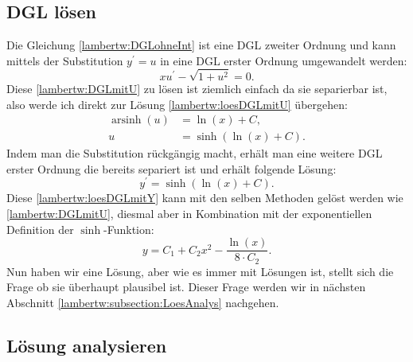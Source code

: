 \subsection{DGL lösen
	\label{lambertw:subsection:DGLloes}}
Die Gleichung \eqref{lambertw:DGLohneInt} ist eine DGL zweiter Ordnung und kann 
mittels der Substitution \(y^{\prime} = u\) in eine DGL erster Ordnung umgewandelt werden:
\begin{equation}
	xu^{\prime} - \sqrt{1+u^2}
	= 0.
	\label{lambertw:DGLmitU}
\end{equation}
Diese \eqref{lambertw:DGLmitU} zu lösen ist ziemlich einfach da sie separierbar ist, also werde ich direkt zur Lösung \eqref{lambertw:loesDGLmitU} übergehen:
\begin{align}
	\operatorname{arsinh}(u)
	&=
	\operatorname{ln}(x) + C, \\
	u
	&=
	\operatorname{sinh}(\operatorname{ln}(x) + C).
	\label{lambertw:loesDGLmitU}
\end{align}
Indem man die Substitution rückgängig macht, erhält man eine weitere DGL erster Ordnung die bereits separiert ist und erhält folgende Lösung:
\begin{equation}
	y^{\prime}
	=
	\operatorname{sinh}(\operatorname{ln}(x) + C).
	\label{lambertw:loesDGLmitY}
\end{equation}
Diese \eqref{lambertw:loesDGLmitY} kann mit den selben Methoden gelöst werden wie \eqref{lambertw:DGLmitU}, diesmal aber in Kombination mit der exponentiellen Definition der \(\operatorname{sinh}\)-Funktion:
\begin{equation}
	y
	=
	C_1 + C_2 x^2 - \frac{\operatorname{ln}(x)}{8 \cdot C_2}.
\end{equation}
Nun haben wir eine Lösung, aber wie es immer mit Lösungen ist, stellt sich die Frage ob sie überhaupt plausibel ist. Dieser Frage werden wir in nächsten Abschnitt \ref{lambertw:subsection:LoesAnalys} nachgehen.

\subsection{Lösung analysieren
	\label{lambertw:subsection:LoesAnalys}}

